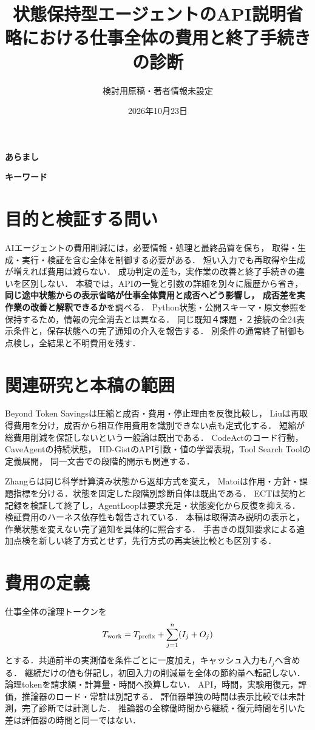 \documentclass[uplatex,a4paper,twocolumn,10pt]{jsarticle}
\title{状態保持型エージェントのAPI説明省略における\newline 仕事全体の費用と終了手続きの診断}
\author{検討用原稿・著者情報未設定}
\date{2026年10月23日}
\begin{document}
\raggedbottom
\maketitle
\noindent\textbf{あらまし}\quad


\noindent\textbf{キーワード}\quad\LetterJapaneseKeywords

\section{目的と検証する問い}
AIエージェントの費用削減には，必要情報・処理と最終品質を保ち，
取得・生成・実行・検証を含む全体を制御する必要がある．
短い入力でも再取得や生成が増えれば費用は減らない\cite{beyond,interaction}．
成功判定の差も，実作業の改善と終了手続きの違いを区別しない．
本稿では，APIの一覧と引数の詳細を別々に履歴から省き，
\textbf{同じ途中状態からの表示省略が仕事全体費用と成否へどう影響し，
成否差を実作業の改善と解釈できるか}を調べる．
Python状態・公開スキーマ・原文参照を保持するため，情報の完全消去とは異なる．
同じ既知４課題・２接続の全24表示条件と，保存状態への完了通知の介入を報告する．
別条件の通常終了制御も点検し，全結果と不明費用を残す．

\section{関連研究と本稿の範囲}
Beyond Token Savings\cite{beyond}は圧縮と成否・費用・停止理由を反復比較し，
Liu\cite{interaction}は再取得費用を分け，成否から相互作用費用を識別できない点も定式化する．
短縮が総費用削減を保証しないという一般論は既出である．
CodeAct\cite{codeact}のコード行動，CaveAgent\cite{cave}の持続状態，
HD-Gist\cite{hdgist}のAPI引数・値の学習表現，Tool Search Tool\cite{toolsearch}の定義展開，
同一文書での段階的開示\cite{disclosure}も関連する．

Zhangら\cite{evidence}は同じ科学計算済み状態から返却方式を変え，
Matoi\cite{matoi}は作用・方針・課題指標を分ける．状態を固定した段階別診断自体は既出である．
ECT\cite{ect}は契約と記録を検証して終了し，AgentLoop\cite{agentloop}は要求充足・状態変化から反復を抑える．
検証費用のハーネス依存性も報告されている\cite{waste}．
本稿は取得済み説明の表示と，作業状態を変えない完了通知を具体的に照合する．
手書きの既知要求による追加点検を新しい終了方式とせず，先行方式の再実装比較とも区別する．

\section{費用の定義}
仕事全体の論理トークンを
\begin{equation}
 T_{\rm work}=T_{\rm prefix}+\sum_{j=1}^{n}(I_j+O_j)
\end{equation}
とする．共通前半の実測値を条件ごとに一度加え，キャッシュ入力も$I_j$へ含める．
継続だけの値も併記し，初回入力の削減量を全体の節約量へ転記しない．
論理tokenを請求額・計算量・時間へ換算しない．
API，時間，実験用復元，評価，推論器のロード・常駐は別記する．
評価器単独の時間は表示比較では未計測，完了診断では計測した．
推論器の全稼働時間から継続・復元時間を引いた差は評価器の時間と同一ではない．
\end{document}

